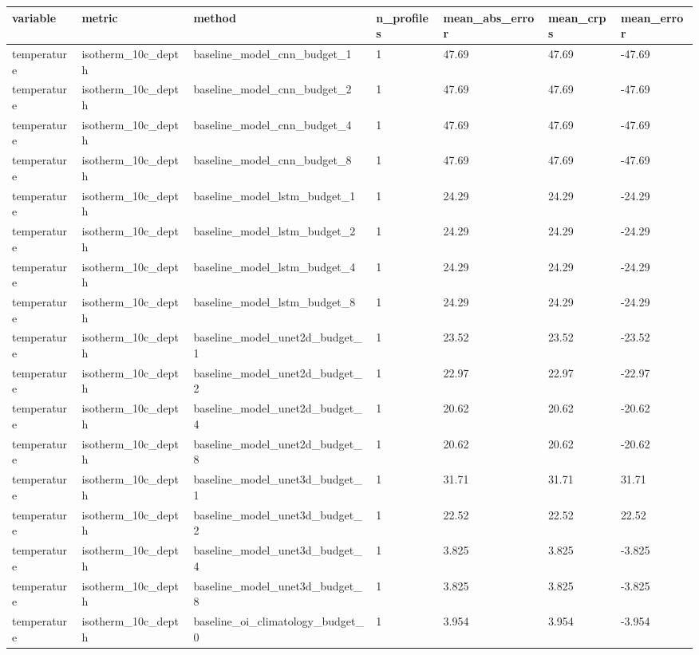 \begin{table}[htbp]
\centering
\begin{tabular}{lllllll}
\toprule
variable & metric & method & n\_profiles & mean\_abs\_error & mean\_crps & mean\_error \\
\midrule
temperature & isotherm\_10c\_depth & baseline\_model\_cnn\_budget\_1 & 1 & 47.69 & 47.69 & -47.69 \\
temperature & isotherm\_10c\_depth & baseline\_model\_cnn\_budget\_2 & 1 & 47.69 & 47.69 & -47.69 \\
temperature & isotherm\_10c\_depth & baseline\_model\_cnn\_budget\_4 & 1 & 47.69 & 47.69 & -47.69 \\
temperature & isotherm\_10c\_depth & baseline\_model\_cnn\_budget\_8 & 1 & 47.69 & 47.69 & -47.69 \\
temperature & isotherm\_10c\_depth & baseline\_model\_lstm\_budget\_1 & 1 & 24.29 & 24.29 & -24.29 \\
temperature & isotherm\_10c\_depth & baseline\_model\_lstm\_budget\_2 & 1 & 24.29 & 24.29 & -24.29 \\
temperature & isotherm\_10c\_depth & baseline\_model\_lstm\_budget\_4 & 1 & 24.29 & 24.29 & -24.29 \\
temperature & isotherm\_10c\_depth & baseline\_model\_lstm\_budget\_8 & 1 & 24.29 & 24.29 & -24.29 \\
temperature & isotherm\_10c\_depth & baseline\_model\_unet2d\_budget\_1 & 1 & 23.52 & 23.52 & -23.52 \\
temperature & isotherm\_10c\_depth & baseline\_model\_unet2d\_budget\_2 & 1 & 22.97 & 22.97 & -22.97 \\
temperature & isotherm\_10c\_depth & baseline\_model\_unet2d\_budget\_4 & 1 & 20.62 & 20.62 & -20.62 \\
temperature & isotherm\_10c\_depth & baseline\_model\_unet2d\_budget\_8 & 1 & 20.62 & 20.62 & -20.62 \\
temperature & isotherm\_10c\_depth & baseline\_model\_unet3d\_budget\_1 & 1 & 31.71 & 31.71 & 31.71 \\
temperature & isotherm\_10c\_depth & baseline\_model\_unet3d\_budget\_2 & 1 & 22.52 & 22.52 & 22.52 \\
temperature & isotherm\_10c\_depth & baseline\_model\_unet3d\_budget\_4 & 1 & 3.825 & 3.825 & -3.825 \\
temperature & isotherm\_10c\_depth & baseline\_model\_unet3d\_budget\_8 & 1 & 3.825 & 3.825 & -3.825 \\
temperature & isotherm\_10c\_depth & baseline\_oi\_climatology\_budget\_0 & 1 & 3.954 & 3.954 & -3.954 \\

\end{tabular}
\end{table}
